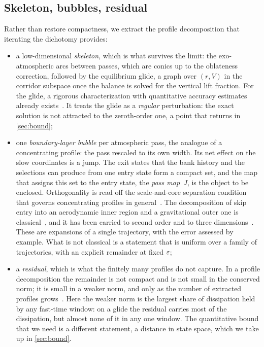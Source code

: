 \documentclass[english,11pt]{extarticle}
\begin{document}
\subsection{Skeleton, bubbles, residual}
Rather than restore compactness, we extract the profile decomposition that
iterating the dichotomy provides:
\begin{itemize}
  \item a low-dimensional \emph{skeleton}, which is what survives the limit:
    the exo-atmospheric arcs between passes, which are conics up to the
    oblateness correction, followed by the equilibrium glide, a graph over
    $(r,V)$ in the corridor subspace once the balance is solved for the
    vertical lift fraction. For the glide, a rigorous characterization with
    quantitative accuracy estimates already
    exists~\cite{lu2006asymptotic}. It treats the glide as a \emph{regular}
    perturbation: the exact solution is not attracted to the zeroth-order
    one, a point that returns in \cref{sec:bound};

  \item one \emph{boundary-layer bubble} per atmospheric pass, the analogue
    of a concentrating profile: the pass rescaled to its own width. Its net
    effect on the slow coordinates is a jump. The exit states that the bank
    history and the selections can produce from one entry state form a
    compact set, and the map that assigns this set to the entry state, the
    \emph{pass map}~$J$, is the object to be enclosed. Orthogonality is read
    off the scale-and-core separation condition that governs concentrating
    profiles in general~\cite{gerard1998description}. The decomposition of
    skip entry into an aerodynamic inner region and a gravitational outer
    one is classical~\cite{shi1971skip,chapman1959approximate}, and it has
    been carried to second order and to three
    dimensions~\cite{kuo1995improved}. These are expansions of a single
    trajectory, with the error assessed by example. What is not classical
    is a statement that is uniform over a family of trajectories, with an
    explicit remainder at fixed $\varepsilon$;

  \item a \emph{residual}, which is what the finitely many profiles do not
    capture. In a profile decomposition the remainder is not compact and is
    not small in the conserved norm; it is small in a weaker norm, and only
    as the number of extracted profiles
    grows~\cite{bahouri1999high,solimini1995note}. Here the weaker norm is
    the largest share of dissipation held by any fast-time window: on a
    glide the residual carries most of the dissipation, but almost none of
    it in any one window. The quantitative bound that we need is a different
    statement, a distance in state space, which we take up in
    \cref{sec:bound}.
\end{itemize}
\end{document}
